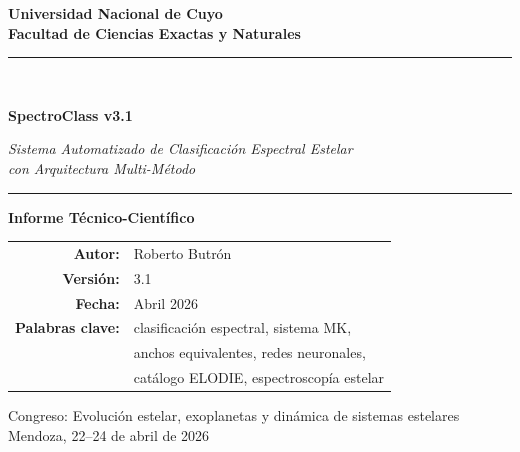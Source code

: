 \documentclass[12pt,a4paper]{article}
\begin{document}
\begin{titlepage}
  \centering
  \vspace*{1.5cm}
  {\Large\bfseries Universidad Nacional de Cuyo\\[0.4em]
  Facultad de Ciencias Exactas y Naturales\par}
  \vspace{1.5cm}
  \rule{\linewidth}{1pt}\\[0.8em]
  {\LARGE\bfseries SpectroClass v3.1\par}
  \vspace{0.5em}
  {\large\itshape Sistema Automatizado de Clasificación Espectral Estelar\\
  con Arquitectura Multi-Método\par}
  \rule{\linewidth}{1pt}
  \vspace{1.5cm}

  {\large\bfseries Informe Técnico-Científico\par}
  \vspace{1.2cm}

  \begin{tabular}{rl}
    \textbf{Autor:}  & Roberto Butrón \\[0.3em]
    \textbf{Versión:}  & 3.1 \\[0.3em]
    \textbf{Fecha:}    & Abril 2026 \\[0.3em]
    \textbf{Palabras clave:} & clasificación espectral, sistema MK, \\
                             & anchos equivalentes, redes neuronales, \\
                             & catálogo ELODIE, espectroscopía estelar
  \end{tabular}

  \vfill
  {\small Congreso: Evolución estelar, exoplanetas y dinámica de sistemas estelares\\
  Mendoza, 22--24 de abril de 2026}
\end{titlepage}
\end{document}
